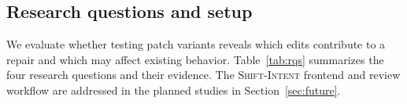 \documentclass[a4paper,fleqn]{cas-sc}
\newcommand{\dsl}{\textsc{Shift-Intent}}
\newcommand{\lab}[1]{\textsf{#1}}
\begin{document}





\subsection{Research questions and setup}\label{sec:setup}

We evaluate whether testing patch variants reveals which edits contribute to a repair and which may affect existing behavior. Table~\ref{tab:rqs} summarizes the four research questions and their evidence. The \dsl{} frontend and review workflow are addressed in the planned studies in Section~\ref{sec:future}.
\end{document}
